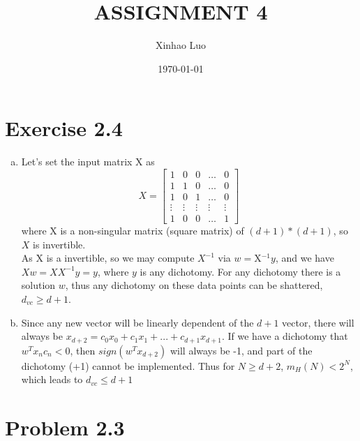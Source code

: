 \documentclass{article}
\title{\bf \Large ASSIGNMENT 4}
\author{Xinhao Luo}
\date{\today}
\def\math#1{$#1$}
\begin{document}
\maketitle
\medskip

\section{Exercise 2.4}

\begin{enumerate}[a)]
    \item Let's set the input matrix X as 
        \begin{equation}
            X = \begin{bmatrix}
                    1 & 0 & 0 & \dots & 0 \\
                    1 & 1 & 0 & \dots & 0 \\
                    1 & 0 & 1 & \dots & 0 \\
                    \vdots & \vdots & \vdots & \vdots & \vdots\\
                    1 & 0 & 0 & \dots & 1
                \end{bmatrix}
        \end{equation}  
    where X is a non-singular matrix (square matrix) of \math{(d + 1) * (d + 1)}, so \math{X} is invertible.  \\
     As X is a invertible, so we may compute \math{X^{-1}} via \math{w = \math{X}^{-1}y}, and we have \math{Xw = XX^{-1}y = y}, where \math{y} is any dichotomy. For any dichotomy there is a solution \math{w}, thus any dichotomy on these data points can be shattered, \math{d_{vc} \geq d + 1}.
    \item Since any new vector will be linearly dependent of the \math{d + 1} vector, there will always be \math{x_{d + 2} = c_0x_0 + c_1x_1 + ... + c_{d + 1}x_{d + 1}}. If we have a dichotomy that \math{w^Tx_nc_n < 0}, then \math{sign(w^Tx_{d + 2})} will always be -1, and part of the dichotomy (+1) cannot be implemented. Thus for \math{N \geq d + 2}, \math{m_H(N) < 2^N}, which leads to \math{d_{vc} \leq d + 1}
\end{enumerate}

\section{Problem 2.3}
\end{document}

